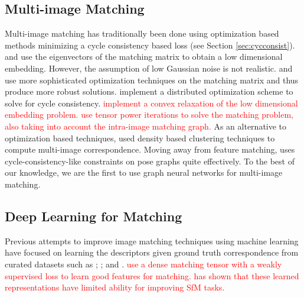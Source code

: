 \documentclass{article} %
\begin{document}
\subsection{Multi-image Matching}
Multi-image matching has traditionally been done using optimization based methods minimizing a cycle consistency based loss (see Section \ref{sec:cycconsist}).
\cite{pachauri2013solving} and \cite{arrigoni2017synchronization} use the eigenvectors of the matching matrix to obtain a low dimensional embedding. 
However, the assumption of low Gaussian noise is not realistic.
\cite{zhou2015multi} and \cite{wang2017multi} use more sophisticated optimization techniques on the matching matrix and thus produce more robust solutions.
\cite{leonardos2017distributed} implement a distributed optimization scheme to solve for cycle consistency.
\textcolor{red}{\cite{swoboda2019convex} implement a convex relaxation of the low dimensional embedding problem.}
\textcolor{red}{\cite{shi2016tensor} use tensor power iterations to solve the matching problem, also taking into account the intra-image matching graph.}
As an alternative to optimization based techniques, \cite{tron2017fast} used density based clustering techniques to compute multi-image correspondence.
Moving away from feature matching, \cite{zach2010disambiguating} uses cycle-consistency-like constraints on pose graphs quite effectively.
To the best of our knowledge, we are the first to use graph neural networks for multi-image matching.

\subsection{Deep Learning for Matching}
Previous attempts to improve image matching techniques using machine learning have focused on learning the descriptors given ground truth correspondence from curated datasets such as \cite{zagoruyko2015learning}; \cite{yi2016lift}; and \cite{brachmann2017dsac}.
\textcolor{red}{\cite{rocco2018neighbourhood} use a dense matching tensor with a weakly supervised loss to learn good features for matching. \cite{zhou2019learn} has shown that these learned representations have limited ability for improving SfM tasks.}
\end{document}
